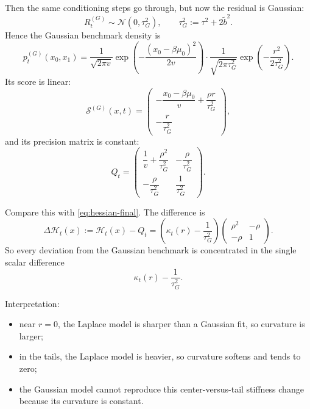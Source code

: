\documentclass[11pt]{article}
\newcommand{\1}{\mathbf{1}}
\newcommand{\pt}{p_t}
\newcommand{\score}{\mathcal{S}}
\newcommand{\curv}{\mathcal{H}}
\newcommand{\Normal}{\mathcal{N}}
\theoremstyle{definition}
\begin{document}
Then the same conditioning steps go through, but now the residual is Gaussian:
\begin{equation}
R_t^{(G)}\sim \Normal(0,\tau_G^2),
\qquad
\tau_G^2 := \tau^2 + 2\tilde b^2.
\end{equation}
Hence the Gaussian benchmark density is
\begin{equation}
\pt^{(G)}(x_0,x_1)=\frac{1}{\sqrt{2\pi v}}\exp\!\left(-\frac{(x_0-\beta\mu_0)^2}{2v}\right)
\cdot
\frac{1}{\sqrt{2\pi\tau_G^2}}\exp\!\left(-\frac{r^2}{2\tau_G^2}\right).
\end{equation}
Its score is linear:
\begin{equation}
\score^{(G)}(x,t)=
\begin{pmatrix}
-\dfrac{x_0-\beta\mu_0}{v}+\dfrac{\rho r}{\tau_G^2}\\[0.8em]
-\dfrac{r}{\tau_G^2}
\end{pmatrix},
\end{equation}
and its precision matrix is constant:
\begin{equation}
\label{eq:Qt-definition}
Q_t=
\begin{pmatrix}
\dfrac{1}{v}+\dfrac{\rho^2}{\tau_G^2} & -\dfrac{\rho}{\tau_G^2}\\[0.8em]
-\dfrac{\rho}{\tau_G^2} & \dfrac{1}{\tau_G^2}
\end{pmatrix}.
\end{equation}

Compare this with \eqref{eq:hessian-final}. The difference is
\begin{equation}
\label{eq:deltaH-definition}
\boxed{
\Delta \curv_t(x):=\curv_t(x)-Q_t
=
\left(\kappa_t(r)-\frac{1}{\tau_G^2}\right)
\begin{pmatrix}
\rho^2 & -\rho\\[0.4em]
-\rho & 1
\end{pmatrix}.
}
\end{equation}
So every deviation from the Gaussian benchmark is concentrated in the single scalar difference
\begin{equation}
\kappa_t(r)-\frac{1}{\tau_G^2}.
\end{equation}

Interpretation:
\begin{itemize}[leftmargin=2em]
    \item near \(r=0\), the Laplace model is sharper than a Gaussian fit, so curvature is larger;
    \item in the tails, the Laplace model is heavier, so curvature softens and tends to zero;
    \item the Gaussian model cannot reproduce this center-versus-tail stiffness change because its curvature is constant.
\end{itemize}
\end{document}
